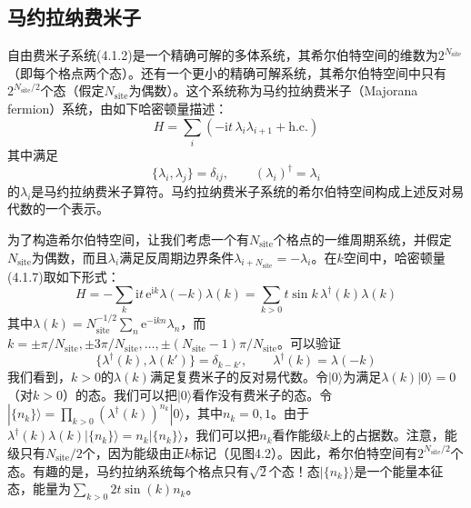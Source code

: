 \subsection{马约拉纳费米子}

自由费米子系统(4.1.2)是一个精确可解的多体系统，其希尔伯特空间的维数为$2^{N_{\mathrm{site}}}$（即每个格点两个态）。还有一个更小的精确可解系统，其希尔伯特空间中只有$2^{N_{\mathrm{site}}/2}$个态（假定$N_{\mathrm{site}}$为偶数）。这个系统称为马约拉纳费米子（Majorana fermion）系统，由如下哈密顿量描述：
\begin{equation*}
H=\sum_{i}(-\mathrm{i}t\,\lambda_{i}\lambda_{i+1}+\text{h.c.})\tag{4.1.7}
\end{equation*}
其中满足
\begin{equation*}
\{\lambda_{i},\lambda_{j}\}=\delta_{ij},\qquad (\lambda_{i})^{\dagger}=\lambda_{i}\tag{4.1.8}
\end{equation*}
的$\lambda_{i}$是马约拉纳费米子算符。马约拉纳费米子系统的希尔伯特空间构成上述反对易代数的一个表示。

为了构造希尔伯特空间，让我们考虑一个有$N_{\mathrm{site}}$个格点的一维周期系统，并假定$N_{\mathrm{site}}$为偶数，而且$\lambda_{i}$满足反周期边界条件$\lambda_{i+N_{\mathrm{site}}}=-\lambda_{i}$。在$k$空间中，哈密顿量(4.1.7)取如下形式：
\begin{equation*}
H=-\sum_{k}\mathrm{i}t\,\mathrm{e}^{\mathrm{i}k}\lambda(-k)\lambda(k)=\sum_{k>0}t\sin k\,\lambda^{\dagger}(k)\lambda(k)
\end{equation*}
其中$\lambda(k)=N_{\mathrm{site}}^{-1/2}\sum_{n}\mathrm{e}^{-\mathrm{i}kn}\lambda_{n}$，而$k=\pm\pi/N_{\mathrm{site}},\pm3\pi/N_{\mathrm{site}},\ldots,\pm(N_{\mathrm{site}}-1)\pi/N_{\mathrm{site}}$。可以验证
\begin{equation*}
\{\lambda^{\dagger}(k),\lambda(k')\}=\delta_{k-k'},\qquad \lambda^{\dagger}(k)=\lambda(-k)
\end{equation*}
我们看到，$k>0$的$\lambda(k)$满足复费米子的反对易代数。令$|0\rangle$为满足$\lambda(k)|0\rangle=0$（对$k>0$）的态。我们可以把$|0\rangle$看作没有费米子的态。令$|\{n_k\}\rangle=\prod_{k>0}(\lambda^{\dagger}(k))^{n_k}|0\rangle$，其中$n_k=0,1$。由于$\lambda^{\dagger}(k)\lambda(k)|\{n_k\}\rangle=n_k|\{n_k\}\rangle$，我们可以把$n_k$看作能级$k$上的占据数。注意，能级只有$N_{\mathrm{site}}/2$个，因为能级由正$k$标记（见图4.2）。因此，希尔伯特空间有$2^{N_{\mathrm{site}}/2}$个态。有趣的是，马约拉纳系统每个格点只有$\sqrt{2}$个态！态$|\{n_k\}\rangle$是一个能量本征态，能量为$\sum_{k>0}2t\sin(k)n_k$。


